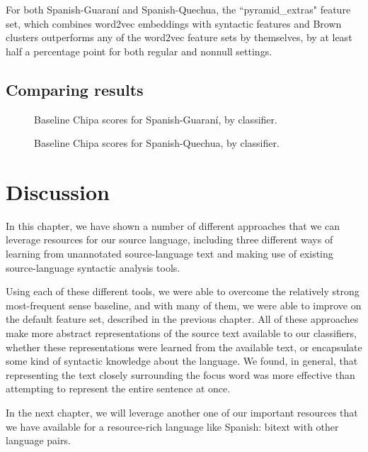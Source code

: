 For both Spanish-Guaraní and Spanish-Quechua, the ``pyramid\_extras" feature
set, which combines word2vec embeddings with syntactic features and Brown
clusters outperforms any of the word2vec feature sets by themselves, by at
least half a percentage point for both regular and nonnull settings. 

\subsection{Comparing results}
\begin{figure}
  \caption{Baseline Chipa scores for Spanish-Guaraní, by classifier.}
  \label{fig:esgnresults:monolingual}
\end{figure}

\begin{figure}
  \caption{Baseline Chipa scores for Spanish-Quechua, by classifier.}
  \label{fig:esquresults:monolingual}
\end{figure}


\section{Discussion}
In this chapter, we have shown a number of different approaches that we can
leverage resources for our source language, including three different ways of
learning from unannotated source-language text and making use of existing
source-language syntactic analysis tools.

Using each of these different tools, we were able to overcome the relatively
strong most-frequent sense baseline, and with many of them, we were able to
improve on the default feature set, described in the previous chapter. All of
these approaches make more abstract representations of the source text
available to our classifiers, whether these representations were learned from
the available text, or encapsulate some kind of syntactic knowledge about the
language. We found, in general, that representing the text closely surrounding
the focus word was more effective than attempting to represent the entire
sentence at once.

In the next chapter, we will leverage another one of our important resources
that we have available for a resource-rich language like Spanish: bitext with
other language pairs.
